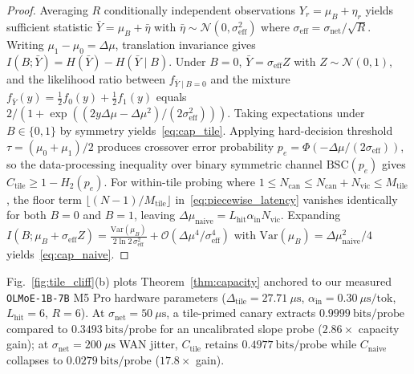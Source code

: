\documentclass[final,5p,times,twocolumn]{elsarticle}
\theoremstyle{definition}
\theoremstyle{remark}
\begin{document}
\begin{proof}
Averaging $R$ conditionally independent observations $Y_r = \mu_B + \eta_r$ yields sufficient statistic $\bar{Y} = \mu_B + \bar{\eta}$ with $\bar{\eta} \sim \mathcal{N}(0, \sigma_{\mathrm{eff}}^2)$ where $\sigma_{\mathrm{eff}} = \sigma_{\mathrm{net}}/\sqrt{R}$. Writing $\mu_1 - \mu_0 = \Delta\mu$, translation invariance gives $I(B; \bar{Y}) = H(\bar{Y}) - H(\bar{Y} \mid B)$. Under $B=0$, $\bar{Y} = \sigma_{\mathrm{eff}} Z$ with $Z \sim \mathcal{N}(0,1)$, and the likelihood ratio between $f_{\bar{Y}\mid B=0}$ and the mixture $f_{\bar{Y}}(y) = \frac{1}{2} f_0(y) + \frac{1}{2} f_1(y)$ equals $2 / (1 + \exp((2 y \Delta\mu - \Delta\mu^2)/(2\sigma_{\mathrm{eff}}^2)))$. Taking expectations under $B \in \{0,1\}$ by symmetry yields~\eqref{eq:cap_tile}. Applying hard-decision threshold $\tau = (\mu_0 + \mu_1)/2$ produces crossover error probability $p_e = \Phi(-\Delta\mu / (2\sigma_{\mathrm{eff}}))$, so the data-processing inequality over binary symmetric channel $\mathrm{BSC}(p_e)$ gives $C_{\mathrm{tile}} \ge 1 - H_2(p_e)$. For within-tile probing where $1 \le N_{\mathrm{can}} \le N_{\mathrm{can}} + N_{\mathrm{vic}} \le M_{\mathrm{tile}}$, the floor term $\lfloor (N-1)/M_{\mathrm{tile}} \rfloor$ in~\eqref{eq:piecewise_latency} vanishes identically for both $B=0$ and $B=1$, leaving $\Delta\mu_{\mathrm{naive}} = L_{\mathrm{hit}} \alpha_{\mathrm{in}} N_{\mathrm{vic}}$. Expanding $I(B; \mu_B + \sigma_{\mathrm{eff}} Z) = \frac{\mathrm{Var}(\mu_B)}{2 \ln 2 \, \sigma_{\mathrm{eff}}^2} + \mathcal{O}(\Delta\mu^4 / \sigma_{\mathrm{eff}}^4)$ with $\mathrm{Var}(\mu_B) = \Delta\mu_{\mathrm{naive}}^2 / 4$ yields~\eqref{eq:cap_naive}.
\end{proof}

Fig.~\ref{fig:tile_cliff}(b) plots Theorem~\ref{thm:capacity} anchored to our measured \texttt{OLMoE-1B-7B} M5 Pro hardware parameters ($\Delta_{\mathrm{tile}} = 27.71~\mu\mathrm{s}$, $\alpha_{\mathrm{in}} = 0.30~\mu\mathrm{s}/\text{tok}$, $L_{\mathrm{hit}} = 6$, $R = 6$). At $\sigma_{\mathrm{net}} = 50~\mu\mathrm{s}$, a tile-primed canary extracts $0.9999~\mathrm{bits/probe}$ compared to $0.3493~\mathrm{bits/probe}$ for an uncalibrated slope probe ($2.86\times$ capacity gain); at $\sigma_{\mathrm{net}} = 200~\mu\mathrm{s}$ WAN jitter, $C_{\mathrm{tile}}$ retains $0.4977~\mathrm{bits/probe}$ while $C_{\mathrm{naive}}$ collapses to $0.0279~\mathrm{bits/probe}$ ($17.8\times$ gain).
\end{document}
